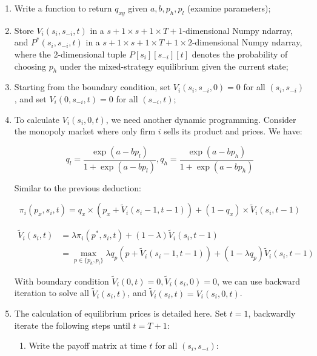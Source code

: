 \documentclass[12pt,letterpaper]{article}
\begin{document}
\begin{enumerate}
    \item Write a function to return $q_{xy}$ given $a, b, p_h, p_l$ (examine parameters);
    \item Store $V_i(s_i,s_{-i},t)$ in a $s+1\times s+1\times T+1$-dimensional Numpy ndarray, and $P^*(s_i, s_{-i}, t)$ in a $s+1\times s+1\times T+1 \times 2$-dimensional Numpy ndarray, where the 2-dimensional tuple $P[s_{i}][s_{-i}][t]$ denotes the probability of choosing $p_h$ under the mixed-strategy equilibrium given the current state;
    \item Starting from the boundary condition, set $V_i(s_i, s_{-i}, 0)=0$ for all $(s_i, s_{-i})$, and set $V_i(0, s_{-i}, t)=0$ for all $(s_{-i}, t)$;
    \item To calculate $V_i(s_i,0,t)$, we need another dynamic programming. Consider the monopoly market where only firm $i$ sells its product and prices. We have:
    
    \[
        q_{l} = \frac{\exp(a-bp_l)}{1+\exp(a-bp_l)}, q_{h} = \frac{\exp(a-bp_h)}{1+\exp(a-bp_h)}
    \]

    Similar to the previous deduction:
    
    \[  
        \pi_i(p_x,s_i,t) = q_x \times  (p_x+\tilde{V}_i(s_i-1,t-1)) + (1-q_x) \times \tilde{V}_i(s_i,t-1)
    \]
    
    \[
        \begin{align}
            \tilde{V}_i(s_i,t) &= \lambda \pi_i(p^*,s_i,t) + (1-\lambda) \tilde{V}_i(s_i,t-1) \\
            &= \max_{p\in\{p_h,p_l\}} \lambda q_p (p+\tilde{V}_i(s_i-1,t-1)) + (1-\lambda q_p) \tilde{V}_i(s_i,t-1)
        \end{align}
        
    \]

    With boundary condition $\tilde{V}_i(0,t)=0, \tilde{V}_i(s_i,0)=0$, we can use backward iteration to solve all $\tilde{V}_i(s_i,t)$, and $\tilde{V}_i(s_i,t)= V_i(s_i,0,t)$.
    \item The calculation of equilibrium prices is detailed here. Set $t=1$, backwardly iterate the following steps until $t=T+1$:
    
    \begin{enumerate}
        \item Write the payoff matrix at time $t$ for all $(s_i,s_{-i})$:
        

\end{enumerate}
\end{enumerate}
\end{document}
